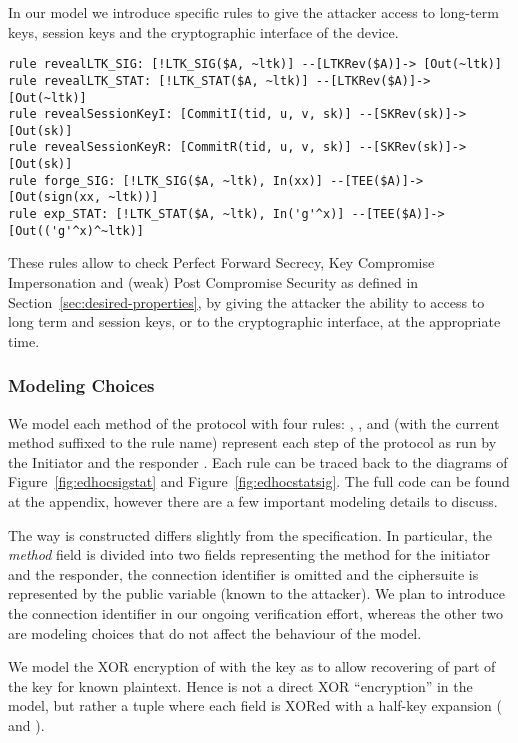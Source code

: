 In our model we introduce specific rules to give the attacker access to
long-term keys, session keys and the cryptographic interface of the device.
\begin{lstlisting}
rule revealLTK_SIG: [!LTK_SIG($A, ~ltk)] --[LTKRev($A)]-> [Out(~ltk)]
rule revealLTK_STAT: [!LTK_STAT($A, ~ltk)] --[LTKRev($A)]-> [Out(~ltk)]
rule revealSessionKeyI: [CommitI(tid, u, v, sk)] --[SKRev(sk)]-> [Out(sk)]
rule revealSessionKeyR: [CommitR(tid, u, v, sk)] --[SKRev(sk)]-> [Out(sk)]
rule forge_SIG: [!LTK_SIG($A, ~ltk), In(xx)] --[TEE($A)]-> [Out(sign(xx, ~ltk))]
rule exp_STAT: [!LTK_STAT($A, ~ltk), In('g'^x)] --[TEE($A)]-> [Out(('g'^x)^~ltk)]
\end{lstlisting}
These rules allow to check Perfect Forward Secrecy, Key Compromise Impersonation
and (weak) Post Compromise Security as defined in Section~\ref{sec:desired-properties},
by giving the attacker the ability to access to long term and session keys, or
to the cryptographic interface, at the appropriate time.

\subsubsection{Modeling Choices}

We model each method of the protocol with four rules: , , 
and  (with the current method suffixed to the rule name) represent each
step of the protocol as run by the Initiator  and the responder .
Each rule can be traced back to the diagrams of Figure~\ref{fig:edhocsigstat}
and Figure~\ref{fig:edhocstatsig}.
%
The full code can be found at the appendix, however there are a few important
modeling details to discuss.

The way  is constructed differs slightly from the specification. In
particular, the \emph{method} field is divided into two fields representing the
method for the initiator and the responder, the connection identifier is omitted
and the ciphersuite is represented by the public variable
 (known to the attacker). We plan to introduce the connection
identifier \mCi in our ongoing verification effort, whereas the other two are
modeling choices that do not affect the behaviour of the model.

We model the XOR encryption of  with the key  as to
allow recovering of part of the key for known plaintext.
%
Hence  is not a direct XOR ``encryption'' in the model, but
rather a tuple where each field is XORed with a half-key expansion (
and ).


